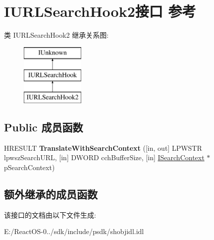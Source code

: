\hypertarget{interface_i_u_r_l_search_hook2}{}\section{I\+U\+R\+L\+Search\+Hook2接口 参考}
\label{interface_i_u_r_l_search_hook2}
类 I\+U\+R\+L\+Search\+Hook2 继承关系图\+:\begin{figure}[H]
\begin{center}
\leavevmode
\includegraphics[height=3.000000cm]{interface_i_u_r_l_search_hook2}
\end{center}
\end{figure}
\subsection*{Public 成员函数}
\begin{DoxyCompactItemize}
\item 
\mbox{\label{interface_i_u_r_l_search_hook2_a4bbe20f5933adfff2582690a6f18b390}} 
H\+R\+E\+S\+U\+LT {\bfseries Translate\+With\+Search\+Context} (\mbox{[}in, out\mbox{]} L\+P\+W\+S\+TR lpwsz\+Search\+U\+RL, \mbox{[}in\mbox{]} D\+W\+O\+RD cch\+Buffer\+Size, \mbox{[}in\mbox{]} \hyperlink{interface_i_search_context}{I\+Search\+Context} $\ast$p\+Search\+Context)
\end{DoxyCompactItemize}
\subsection*{额外继承的成员函数}


该接口的文档由以下文件生成\+:\begin{DoxyCompactItemize}
\item 
E\+:/\+React\+O\+S-\/0../sdk/include/psdk/shobjidl.\+idl\end{DoxyCompactItemize}
